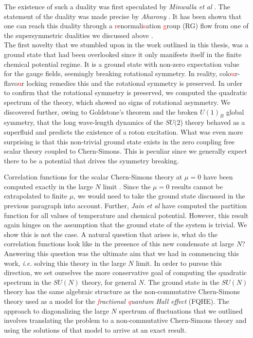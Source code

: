 The existence of such a duality was first speculated by \textit{Minwalla et al} \cite{Giombi:2011kc}. The statement of the duality was made precise by \textit{Aharony} \cite{Aharony:2015mjs}.  It has been shown that one can reach this duality through a \textcolor{red}{r}enormali\textcolor{red}{s}ation \textcolor{red}{g}roup (RG) flow from one of the supersymmetric dualities we discussed above \cite{Gur-Ari:2015pca}.\\

The first novelty that we stumbled upon in the work outlined in this thesis, was a ground state that had been overlooked since it only manifests itself in the finite chemical potential regime. It is a ground state with non-zero expectation value for the gauge fields, seemingly breaking rotational symmetry. In reality, colo\textcolor{red}{u}r-flavo\textcolor{red}{u}r locking remedies this and the rotational symmetry is preserved. In order to confirm that the rotational symmetry is preserved, we computed the quadratic spectrum of the theory, which showed no signs of rotational asymmetry. We discovered further, owing to Goldstone's theorem and the broken $U(1)_B$ global symmetry, that the long wave-length dynamics of the $SU(2$) theory behaved as a superfluid and predicts the existence of a roton excitation. What was even more surprising is that this non-trivial ground state exists in the zero coupling free scalar theory coupled to Chern-Simons. This is peculiar since we generally expect there to be a potential that drives the symmetry breaking.

Correlation functions for the scalar Chern-Simons theory at $\mu=0$ have been computed exactly in the large $N$ limit \cite{Aharony:2012nh}. Since the $\mu =0$ results cannot be extrapolated to finite $\mu$, we would need to take the ground state discussed in the previous paragraph into account. Further, \textit{Jain et al} \cite{Jain:2013gza} have computed the partition function for all values of temperature and chemical potential. However, this result again hinges on the assumption that the ground state of the system is trivial. We show this is not the case. A natural question that arises is, what do the correlation functions look like in the presence of this new condensate at large $N$? Answering this question was the ultimate aim that we had in commencing this work, \textit{i.e.} solving this theory in the large $N$ limit. In order to pursue this direction, we set ourselves the more conservative goal of computing the quadratic spectrum in the $SU(N)$ theory, for general $N$. The ground state in the $SU(N)$ theory has the same algebraic structure as the non-commutative Chern-Simons theory used as a model for the \textit{\textcolor{red}{f}ractional \textcolor{red}{q}uantum Hall effect} (FQHE). The approach to diagonalizing the large $N$ spectrum of fluctuations that we outlined involves translating the problem to a non-commutative Chern-Simons theory and using the solutions of that model to arrive at an exact result.

